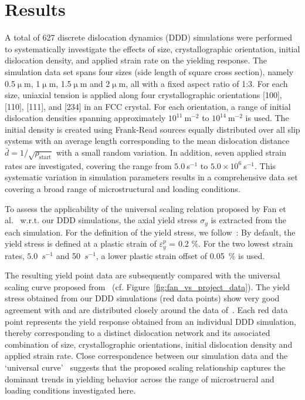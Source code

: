 \documentclass[pdflatex,sn-mathphys-num]{sn-jnl}%
\theoremstyle{thmstyleone}%
\theoremstyle{thmstyletwo}%
\theoremstyle{thmstylethree}%
\begin{document}
\section{Results}\label{sec:results}

A total of 627 discrete dislocation dynamics (DDD) simulations were performed to systematically investigate the effects of size, crystallographic orientation, initial dislocation density, and applied strain rate on the yielding response.
The simulation data set spans four sizes (side length of square cross section), namely 0.5$\upmu$m, 1$\upmu$m, 1.5$\upmu$m and 2$\upmu$m, all with a fixed aspect ratio of 1:3.
For each size, uniaxial tension is applied along four crystallographic orientations [100], [110], [111], and [234] in an FCC crystal.
For each orientation, a range of initial dislocation densities spanning approximately $10^{11}~$m$^{-2}$ to $10^{14}~$m$^{-2}$ is used.
The initial density is created using Frank-Read sources equally distributed over all slip systems with an average length corresponding to the mean dislocation distance $\bar{d} = 1/\sqrt{\rho_{\text{start}}}$ with a small random variation.
In addition, seven applied strain rates are investigated, covering the range from $5.0~$s$^{-1}$ to $5.0\times 10^{6}~$s$^{-1}$.
This systematic variation in simulation parameters results in a comprehensive data set covering a broad range of microstructural and loading conditions. 

To assess the applicability of the universal scaling relation proposed by Fan et al.~\cite{Fan2021} w.r.t. our DDD simulations, the axial yield stress $\sigma_y$ is extracted from the each simulation.
For the definition of the yield stress, we follow~\cite{Fan2021}: By default, the yield stress is defined at a plastic strain of $\varepsilon_y^p$ = 0.2 \%.
For the two lowest strain rates, $5.0$~$s^{-1}$ and 50~$s^{-1}$, a lower plastic strain offset of 0.05~\% is used.

The resulting yield point data are subsequently compared with the universal scaling curve proposed from~\cite{Fan2021} (cf. Figure~\ref{fig:fan_vs_project_data}).
The yield stress obtained from our DDD simulations (red data points) show very good agreement with and are distributed closely around the data of~\cite{Fan2021}.
Each red data point represents the yield response obtained from an individual DDD simulation, thereby corresponding to a distinct dislocation network and its associated combination of size, crystallographic orientations, initial dislocation density and applied strain rate.
Close correspondence between our simulation data and the `universal curve'~\cite{Fan2021} suggests that the proposed scaling relationship captures the dominant trends in yielding behavior across the range of microstrucral and loading conditions investigated here.
 
\end{document}
